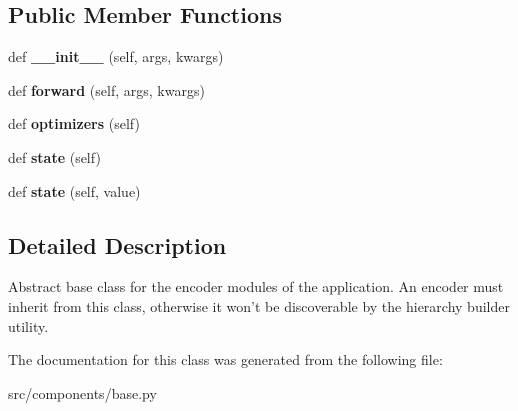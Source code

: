 \subsection*{Public Member Functions}
\begin{DoxyCompactItemize}
\item 
def {\bfseries \+\_\+\+\_\+init\+\_\+\+\_\+} (self, args, kwargs)\hypertarget{classbase_1_1Encoder_af514ec6b1374cc03b81f8487a47133b9}{}\label{classbase_1_1Encoder_af514ec6b1374cc03b81f8487a47133b9}

\item 
def {\bfseries forward} (self, args, kwargs)\hypertarget{classbase_1_1Encoder_a8dab70aa94cd40cb0e593b83e99a5703}{}\label{classbase_1_1Encoder_a8dab70aa94cd40cb0e593b83e99a5703}

\item 
def {\bfseries optimizers} (self)\hypertarget{classbase_1_1Encoder_af3bbb9f6332fb18878b67ccb61f9cb76}{}\label{classbase_1_1Encoder_af3bbb9f6332fb18878b67ccb61f9cb76}

\item 
def {\bfseries state} (self)\hypertarget{classbase_1_1Encoder_a3daeae83d0344416ce9d3e96cac6ae24}{}\label{classbase_1_1Encoder_a3daeae83d0344416ce9d3e96cac6ae24}

\item 
def {\bfseries state} (self, value)\hypertarget{classbase_1_1Encoder_a1b581db8dc18b9ceb95a57372ca9447c}{}\label{classbase_1_1Encoder_a1b581db8dc18b9ceb95a57372ca9447c}

\end{DoxyCompactItemize}


\subsection{Detailed Description}
\begin{DoxyVerb}Abstract base class for the encoder modules of the application. An encoder must
inherit from this class, otherwise it won't be discoverable by the hierarchy
builder utility.
\end{DoxyVerb}
 

The documentation for this class was generated from the following file\+:\begin{DoxyCompactItemize}
\item 
src/components/base.\+py\end{DoxyCompactItemize}
